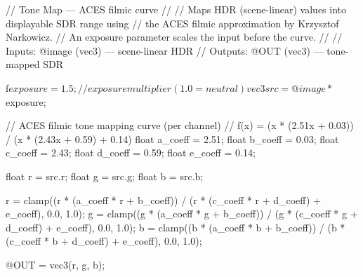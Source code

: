 // Tone Map — ACES filmic curve
//
// Maps HDR (scene-linear) values into displayable SDR range using
// the ACES filmic approximation by Krzysztof Narkowicz.
// An exposure parameter scales the input before the curve.
//
// Inputs:  @image (vec3) — scene-linear HDR
// Outputs: @OUT   (vec3) — tone-mapped SDR

f$exposure = 1.5;   // exposure multiplier (1.0 = neutral)

vec3 src = @image * $exposure;

// ACES filmic tone mapping curve (per channel)
// f(x) = (x * (2.51x + 0.03)) / (x * (2.43x + 0.59) + 0.14)
float a_coeff = 2.51;
float b_coeff = 0.03;
float c_coeff = 2.43;
float d_coeff = 0.59;
float e_coeff = 0.14;

float r = src.r;
float g = src.g;
float b = src.b;

r = clamp((r * (a_coeff * r + b_coeff)) / (r * (c_coeff * r + d_coeff) + e_coeff), 0.0, 1.0);
g = clamp((g * (a_coeff * g + b_coeff)) / (g * (c_coeff * g + d_coeff) + e_coeff), 0.0, 1.0);
b = clamp((b * (a_coeff * b + b_coeff)) / (b * (c_coeff * b + d_coeff) + e_coeff), 0.0, 1.0);

@OUT = vec3(r, g, b);
